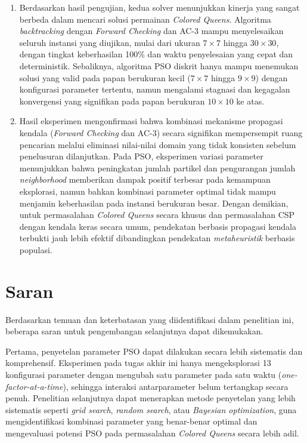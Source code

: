 \begin{enumerate}
	\item Berdasarkan hasil pengujian, kedua solver menunjukkan kinerja yang sangat berbeda dalam mencari solusi permainan \textit{Colored Queens}. Algoritma \textit{backtracking} dengan \textit{Forward Checking} dan AC-3 mampu menyelesaikan seluruh instansi yang diujikan, mulai dari ukuran $7 \times 7$ hingga $30 \times 30$, dengan tingkat keberhasilan 100\% dan waktu penyelesaian yang cepat dan deterministik. Sebaliknya, algoritma PSO diskrit hanya mampu menemukan solusi yang valid pada papan berukuran kecil ($7 \times 7$ hingga $9 \times 9$) dengan konfigurasi parameter tertentu, namun mengalami stagnasi dan kegagalan konvergensi yang signifikan pada papan berukuran $10 \times 10$ ke atas.
	
	\item Hasil eksperimen mengonfirmasi bahwa kombinasi mekanisme propagasi kendala (\textit{Forward Checking} dan AC-3) secara signifikan mempersempit ruang pencarian melalui eliminasi nilai-nilai domain yang tidak konsisten sebelum penelusuran dilanjutkan. Pada PSO, eksperimen variasi parameter menunjukkan bahwa peningkatan jumlah partikel dan pengurangan jumlah \textit{neighborhood} memberikan dampak positif terbesar pada kemampuan eksplorasi, namun bahkan kombinasi parameter optimal tidak mampu menjamin keberhasilan pada instansi berukuran besar. Dengan demikian, untuk permasalahan \textit{Colored Queens} secara khusus dan permasalahan CSP dengan kendala keras secara umum, pendekatan berbasis propagasi kendala terbukti jauh lebih efektif dibandingkan pendekatan \textit{metaheuristik} berbasis populasi.
\end{enumerate}

\section{Saran}
\label{sec:saran}

Berdasarkan temuan dan keterbatasan yang diidentifikasi dalam penelitian ini, beberapa saran untuk pengembangan selanjutnya dapat dikemukakan.

Pertama, penyetelan parameter PSO dapat dilakukan secara lebih sistematis dan komprehensif. Eksperimen pada tugas akhir ini hanya mengeksplorasi 13 konfigurasi parameter dengan mengubah satu parameter pada satu waktu (\textit{one-factor-at-a-time}), sehingga interaksi antarparameter belum tertangkap secara penuh. Penelitian selanjutnya dapat menerapkan metode penyetelan yang lebih sistematis seperti \textit{grid search}, \textit{random search}, atau \textit{Bayesian optimization}, guna mengidentifikasi kombinasi parameter yang benar-benar optimal dan mengevaluasi potensi PSO pada permasalahan \textit{Colored Queens} secara lebih adil.

